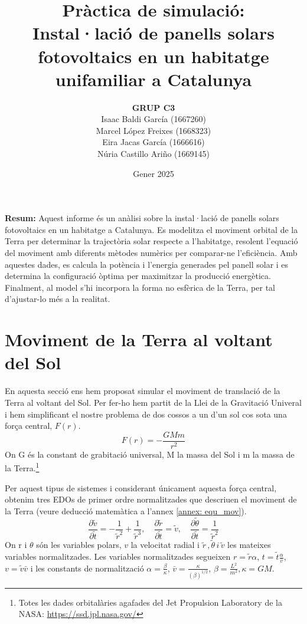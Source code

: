 \documentclass[11pt]{article}
\title{\Huge\bfseries Pràctica de simulació: \\ Instal·lació de panells solars fotovoltaics en un habitatge unifamiliar a Catalunya \\ [2ex] \Large}
\author{\begin{tabular}{c}
\textbf{GRUP C3} \\
Isaac Baldi García (1667260)\\
Marcel López Freixes (1668323) \\
Eira Jacas García (1666616) \\
Núria Castillo Ariño (1669145)
\end{tabular}}
\date{Gener 2025}
\begin{document}
\maketitle
\begin{center}
    \textbf{Resum:} Aquest informe és un anàlisi sobre la instal·lació de panells solars fotovoltaics en un habitatge a Catalunya. Es modelitza el moviment orbital de la Terra per determinar la trajectòria solar respecte a l’habitatge, resolent l’equació del moviment amb diferents mètodes numèrics per comparar-ne l’eficiència. Amb aquestes dades, es calcula la potència i l’energia generades pel panell solar i es determina la configuració òptima per maximitzar la producció energètica. Finalment, al model s'hi incorpora la forma no esfèrica de la Terra, per tal d'ajustar-lo més a la realitat.
\end{center}


\newpage

\tableofcontents
\newpage



\section{Moviment de la Terra al voltant del Sol} \label{sec: seccio_1}
En aquesta secció ens hem proposat simular el moviment de translació de la Terra al voltant del Sol. Per fer-ho hem partit de la Llei de la Gravitació Univeral i hem simplificant el nostre problema de dos cossos a un d'un sol cos sota una força central, $F(r)$.
\begin{equation}
    F(r)=-\frac{GMm}{r^2}
\end{equation}
On G és la constant de grabitació universal, M la massa del Sol i m la massa de la Terra.\footnote{Totes les dades orbitalàries agafades del Jet Propulsion Laboratory de la NASA: \url{https://ssd.jpl.nasa.gov/}}

Per aquest tipus de sistemes i considerant únicament aquesta força central, obtenim tres EDOs de primer ordre normalitzades que descriuen el moviment de la Terra (veure deducció matemàtica a l'annex \ref{annex: equ_mov}).
\begin{equation}
    \frac{\partial\tilde{v}}{\partial\tilde{t}}=-\frac{1}{\tilde{r}^2}+\frac{1}{\tilde{r}^3}, \quad
    \frac{\partial\tilde{r}}{\partial\tilde{t}}=\tilde{v}, \quad
    \frac{\partial\tilde{\theta}}{\partial\tilde{t}}=\frac{1}{\tilde{r}^2}
    \label{eq:all}
\end{equation}
On r i $\theta$ són les variables polars, $v$ la velocitat radial i $\tilde{r}\,, \tilde{\theta}\, i\, \tilde{v}$ les mateixes variables normalitzades. Les variables normalitzades segueixen $r=\tilde{r}\alpha$, $t=\tilde{t}\frac{\alpha}{\bar{v}}$, $v=\tilde{v}\bar{v}$ i les constants de normalització $\alpha = \frac{\beta}{\kappa}$, $\bar{v}=\frac{\kappa}{(\beta)^{1/2}}$, $\beta=\frac{L^2}{m^2}, \kappa=GM$. 
\end{document}
